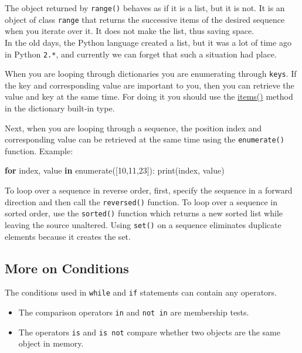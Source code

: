 \documentclass[
]{article}
\newenvironment{Shaded}{}{}
\newcommand{\BuiltInTok}[1]{#1}
\newcommand{\ControlFlowTok}[1]{\textcolor[rgb]{0.00,0.44,0.13}{\textbf{#1}}}
\newcommand{\DecValTok}[1]{\textcolor[rgb]{0.25,0.63,0.44}{#1}}
\newcommand{\KeywordTok}[1]{\textcolor[rgb]{0.00,0.44,0.13}{\textbf{#1}}}
\newcommand{\NormalTok}[1]{#1}
\begin{document}
The object returned by \texttt{range()} behaves as if it is a list, but
it is not. It is an object of class \texttt{range} that returns the
successive items of the desired sequence when you iterate over it. It
does not make the list, thus saving space.\\
In the old days, the Python language created a list, but it was a lot of
time ago in Python \texttt{2.*}, and currently we can forget that such a
situation had place.

When you are looping through dictionaries you are enumerating through
\texttt{keys}. If the key and corresponding value are important to you,
then you can retrieve the value and key at the same time. For doing it
you should use the
\href{https://docs.python.org/3/library/stdtypes.html?highlight=items\#dict.items}{items()}
method in the dictionary built-in type.

Next, when you are looping through a sequence, the position index and
corresponding value can be retrieved at the same time using the
\texttt{enumerate()} function. Example:

\begin{Shaded}
\begin{Highlighting}[]
\ControlFlowTok{for}\NormalTok{  index, value }\KeywordTok{in} \BuiltInTok{enumerate}\NormalTok{([}\DecValTok{10}\NormalTok{,}\DecValTok{11}\NormalTok{,}\DecValTok{23}\NormalTok{]):}
  \BuiltInTok{print}\NormalTok{(index, value)}
\end{Highlighting}
\end{Shaded}

To loop over a sequence in reverse order, first, specify the sequence in
a forward direction and then call the \texttt{reversed()} function. To
loop over a sequence in sorted order, use the \texttt{sorted()} function
which returns a new sorted list while leaving the source unaltered.
Using \texttt{set()} on a sequence eliminates duplicate elements because
it creates the set.

\hypertarget{more-on-conditions}{%
\subsection{More on Conditions}\label{more-on-conditions}}

The conditions used in \texttt{while} and \texttt{if} statements can
contain any operators.

\begin{itemize}
\item
  The comparison operators \texttt{in} and \texttt{not\ in} are
  membership tests.
\item
  The operators \texttt{is} and \texttt{is\ not} compare whether two
  objects are the same object in memory.
\end{itemize}
\end{document}
